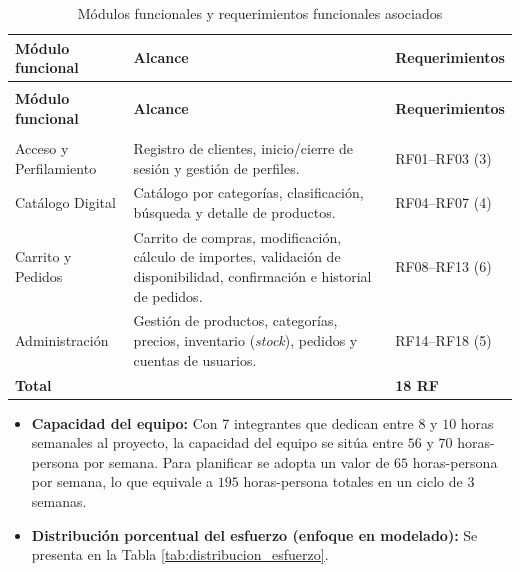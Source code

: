 {\small
\begin{xltabular}{\textwidth}{|>{\raggedright\arraybackslash}p{3.5cm}|X|>{\raggedright\arraybackslash}p{3.0cm}|}
    \caption{Módulos funcionales y requerimientos funcionales asociados}
    \label{tab:modulos_rf} \\
    \hline
    \textbf{Módulo funcional} & \textbf{Alcance} & \textbf{Requerimientos} \\
    \hline
    \endfirsthead

     \\
    \hline
    \textbf{Módulo funcional} & \textbf{Alcance} & \textbf{Requerimientos} \\
    \hline
    \endhead

     \\
    \endfoot

    \endlastfoot

    Acceso y Perfilamiento & Registro de clientes, inicio/cierre de sesión y gestión de perfiles. & RF01--RF03 (3) \\*
    \hline
    Catálogo Digital & Catálogo por categorías, clasificación, búsqueda y detalle de productos. & RF04--RF07 (4) \\*
    \hline
    Carrito y Pedidos & Carrito de compras, modificación, cálculo de importes, validación de disponibilidad, confirmación e historial de pedidos. & RF08--RF13 (6) \\*
    \hline
    Administración & Gestión de productos, categorías, precios, inventario (\textit{stock}), pedidos y cuentas de usuarios. & RF14--RF18 (5) \\*
    \hline
    \textbf{Total} & & \textbf{18 RF} \\
    \hline
\end{xltabular}
}

\begin{itemize}
    \item \textbf{Capacidad del equipo:} Con 7 integrantes que dedican entre $8$ y $10$ horas semanales al proyecto, la capacidad del equipo se sitúa entre $56$ y $70$ horas-persona por semana. Para planificar se adopta un valor de $65$ horas-persona por semana, lo que equivale a $195$ horas-persona totales en un ciclo de $3$ semanas.
    \item \textbf{Distribución porcentual del esfuerzo (enfoque en modelado):} Se presenta en la Tabla \ref{tab:distribucion_esfuerzo}.
\end{itemize}

